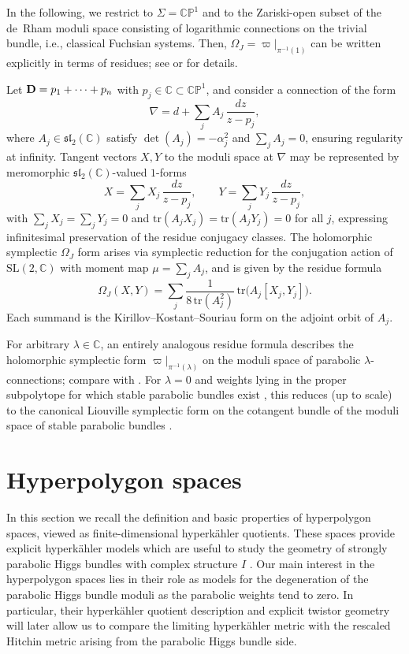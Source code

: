 \documentclass[12pt,a4paper]{amsart}
\theoremstyle{definition}
\theoremstyle{remark}
\newcommand{\C}{\mathbb C}
\newcommand{\CP}{\mathbb{CP}}
\newcommand{\tr}{\mathrm{tr}}
\begin{document}
In the following, we restrict
to \(\Sigma=\CP^1\) and to the Zariski-open subset of the de~Rham moduli space
consisting of logarithmic connections on the trivial bundle, i.e., classical
Fuchsian systems.
Then, \(\Omega_J=\varpi|_{\pi^{-1}(1)}\) can be written explicitly in
terms of residues;
see \cite{AleMale} or \cite[Section~3.4]{HellerHellerTraizet2025} for details.

 Let \({\bf D}=p_1+\dots+p_n\) with \(p_j\in\C\subset\CP^1\), and
consider a connection of the form
\[
\nabla = d + \sum_j A_j\,\frac{dz}{z-p_j},
\]
where \(A_j\in\mathfrak{sl}_2(\C)\) satisfy \(\det(A_j)=-\alpha_j^2\) and
\(\sum_j A_j=0\), ensuring regularity at infinity.
Tangent vectors \(X,Y\) to the moduli space at \(\nabla\) may be represented by
meromorphic \(\mathfrak{sl}_2(\C)\)-valued \(1\)-forms
\[
X=\sum_j X_j\,\frac{dz}{z-p_j}, \qquad
Y=\sum_j Y_j\,\frac{dz}{z-p_j},
\]
with \(\sum_j X_j=\sum_j Y_j=0\) and
\(\tr(A_j X_j)=\tr(A_j Y_j)=0\) for all \(j\), expressing infinitesimal preservation of
the residue conjugacy classes.
The
holomorphic symplectic $\Omega_J$ form arises via symplectic reduction for the conjugation action
of \(\mathrm{SL}(2,\C)\) with moment map \(\mu=\sum_j A_j\), and is given by the residue
formula
\begin{equation}\label{eq:Goldman-Kirilov}
\Omega_J(X,Y)
= \sum_j \frac{1}{8\,\tr(A_j^2)}\,
\tr\!\bigl(A_j[X_j,Y_j]\bigr).
\end{equation}
Each summand is the Kirillov--Kostant--Souriau form on the adjoint orbit of \(A_j\).

For arbitrary \(\lambda\in\C\), an entirely analogous residue formula describes the holomorphic symplectic form  \(\varpi|_{\pi^{-1}(\lambda)}\) on the
moduli space of parabolic \(\lambda\)-connections; compare with \cite[Section 2.7]{HellerHellerTraizet2025}. For \(\lambda=0\) and weights lying in 
the proper subpolytope for which stable parabolic bundles exist \cite{AW98, BY96}, this reduces (up to scale) to the
canonical Liouville symplectic form on the cotangent bundle of the moduli space of stable parabolic bundles \cite{Hitchin1987, Konno}.
 
 


\section{Hyperpolygon spaces}\label{sec:hp}
In this section we recall the definition and basic properties of hyperpolygon spaces,
viewed as finite-dimensional hyperk\"ahler quotients. These spaces provide explicit 
hyperk\"ahler models which are useful to study the geometry of strongly parabolic 
Higgs bundles with complex structure $I$  \cite{GoMa}.
Our main interest in the hyperpolygon spaces lies in their role as  models
for the degeneration of the parabolic Higgs bundle moduli as the parabolic weights
tend to zero.
In particular, their hyperk\"ahler quotient description and explicit twistor geometry
will later allow us to compare the limiting hyperk\"ahler metric with the rescaled
Hitchin metric arising from the parabolic Higgs bundle side.
\end{document}
